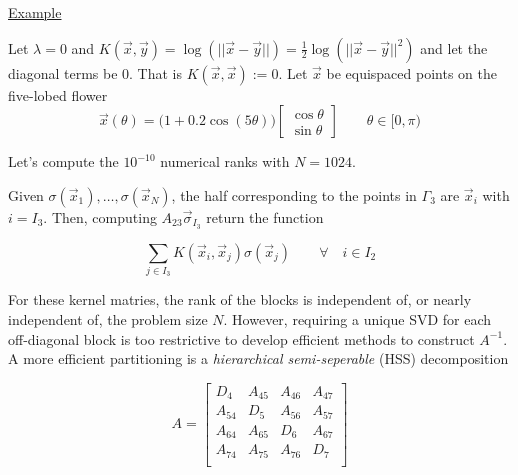 \begin{center}
    
\end{center}

\underline{Example}

Let $\lambda=0$ and $K(\vec{x}, \vec{y})=\log(||\vec{x} - \vec{y}||)=\frac{1}{2}\log(||\vec{x} - \vec{y}||^2)$
and let the diagonal terms be 0. That is $K(\vec{x}, \vec{x}):= 0$. Let $\vec{x}$ be equispaced points on the five-lobed flower
\begin{equation*}
    \vec{x}(\theta) = \big(1 + 0.2 \cos (5 \theta)\big)
    \begin{bmatrix}
        \cos \theta \\
        \sin \theta
    \end{bmatrix}
    \qquad \theta \in [0, \pi)
\end{equation*}

Let's compute the $10^{-10}$ numerical ranks with $N=1024$.



\begin{center}
    
\end{center}

\begin{center}
    
\end{center}

Given $\sigma(\vec{x}_1), \ldots, \sigma(\vec{x}_N)$, the half corresponding to the points in $\Gamma_3$ are $\vec{x}_i$ with $i=I_3$. Then, computing $A_{23}\vec{\sigma}_{I_3}$ return the function

\begin{equation*}
    \sum_{j\in I_3} K(\vec{x}_i, \vec{x}_j)\sigma(\vec{x}_j) \qquad  \forall \quad i \in I_2
\end{equation*}

For these kernel matries, the rank of the blocks is independent of, or nearly independent of, the problem size $N$. However, requiring a unique SVD for each off-diagonal block is too restrictive to develop efficient methods to construct $A^{-1}$. A more efficient partitioning is a \emph{hierarchical semi-seperable} (HSS) decomposition

\begin{equation*}
    A = \begin{bmatrix}
        D_4    & A_{45} & A_{46} & A_{47} \\
        A_{54} & D_5    & A_{56} & A_{57} \\
        A_{64} & A_{65} & D_6    & A_{67} \\
        A_{74} & A_{75} & A_{76} & D_7    \\
\end{bmatrix}
\end{equation*}

